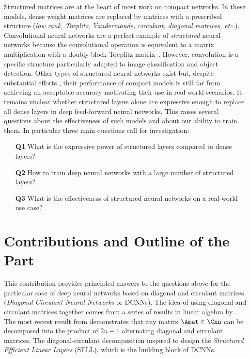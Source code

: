 Structured matrices are at the heart of most work on compact networks.
In these models, dense weight matrices are replaced by matrices with a prescribed structure (\emph{low rank, Toeplitz, Vandermonde, circulant, diagonal matrices, etc.}).
Convolutional neural networks are a perfect example of \emph{structured} neural networks because the convolutional operation is equivalent to a matrix multiplication with a doubly-block Toeplitz matrix~\cite{jain1989fundamentals}.
However, convolution is a specific structure particularly adapted to image classification and object detection.
Other types of structured neural networks exist but, despite substantial efforts \cite{cheng2015exploration,moczulski2016acdc}, their performance of compact models is still far from achieving an acceptable accuracy motivating their use in real-world scenarios.
It remains unclear whether structured layers alone are expressive enough to replace all dense layers in deep feed-forward neural networks.
This raises several questions about the effectiveness of such models and about our ability to train them.
In particular three main questions call for investigation:
\begin{itemize}
  \item[\textbf{Q1}] What is the expressive power of structured layers compared to dense layers?
  \item[\textbf{Q2}] How to train deep neural networks with a large number of structured layers?
  \item[\textbf{Q3}] What is the effectiveness of structured neural networks on a real-world use case?
\end{itemize}


\section{Contributions and Outline of the Part}
\label{section:p1-ch2-contributions_and_outline_of_the_part}

This contribution provides principled answers to the questions above for the particular case of deep neural networks based on diagonal and circulant matrices (\aka \emph{Diagonal Circulant Neural Networks} or DCNNs).
The idea of using diagonal and circulant matrices together comes from a series of results in linear algebra by \citet{muller1998algorithmic,huhtanen2015factoring}.
The most recent result from \citet{huhtanen2015factoring} demonstrates that any matrix $\Amat \in \Cnn$ can be decomposed into the product of $2n-1$ alternating diagonal and circulant matrices.
The diagonal-circulant decomposition inspired \citet{moczulski2016acdc} to design the \emph{Structured Efficient Linear Layers} (SELL), which is the building block of DCNNs.

